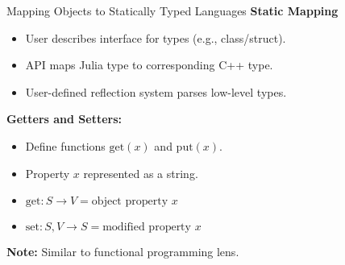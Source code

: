 
\begin{frame}{Mapping Objects to Statically Typed Languages}
    \textbf{Static Mapping}
    \begin{itemize}
        \item User describes interface for types (e.g., class/struct).
        \item API maps Julia type to corresponding C++ type.
        \item User-defined reflection system parses low-level types.
    \end{itemize}
    
    \vspace{0.5cm}
    \pause
    \textbf{Getters and Setters:}
    \begin{itemize}
        \item Define functions $\text{get}(x)$ and $\text{put}(x)$.
        \item Property $x$ represented as a string.
        \item $\text{get}: S \rightarrow V = \text{object property } x$
        \item $\text{set}: S, V \rightarrow S = \text{modified property } x$
    \end{itemize}
    
    \vspace{0.5cm}
    \pause
    \textbf{Note:} Similar to functional programming lens.
\end{frame}